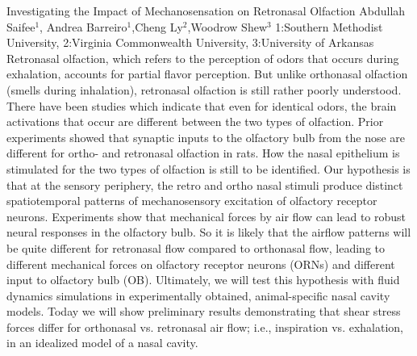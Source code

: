 \begin{addmargin}[2em]{0em}
\vspace{1.5ex}
\abs
{Investigating the Impact of Mechanosensation on Retronasal Olfaction}
{Abdullah Saifee$^1$, Andrea Barreiro$^1$,Cheng Ly$^2$,Woodrow Shew$^3$}
{1:Southern Methodist University, 2:Virginia Commonwealth University, 3:University of Arkansas}
{Retronasal olfaction, which refers to the perception of odors that occurs during exhalation, accounts for partial flavor perception. But unlike orthonasal olfaction (smells during inhalation), retronasal olfaction is still rather poorly understood. There have been studies which indicate that even for identical odors, the brain activations that occur are different between the two types of olfaction. Prior experiments showed that synaptic inputs to the olfactory bulb from the nose are different for ortho- and retronasal olfaction in rats. How the nasal epithelium is stimulated for the two types of olfaction is still to be identified. Our hypothesis is that at the sensory periphery, the retro and ortho nasal stimuli produce distinct spatiotemporal patterns of mechanosensory excitation of olfactory receptor neurons. Experiments show that mechanical forces by air flow can lead to robust neural responses in the olfactory bulb. So it is likely that the airflow patterns will be quite different for retronasal flow compared to orthonasal flow, leading to different mechanical forces on olfactory receptor neurons (ORNs) and different input to olfactory bulb (OB). Ultimately, we will test this hypothesis with fluid dynamics simulations in experimentally obtained, animal-specific nasal cavity models.  Today we will show preliminary results demonstrating that shear stress forces differ for orthonasal vs. retronasal air flow; i.e., inspiration vs. exhalation, in an idealized model of a nasal cavity.}


\end{addmargin}


